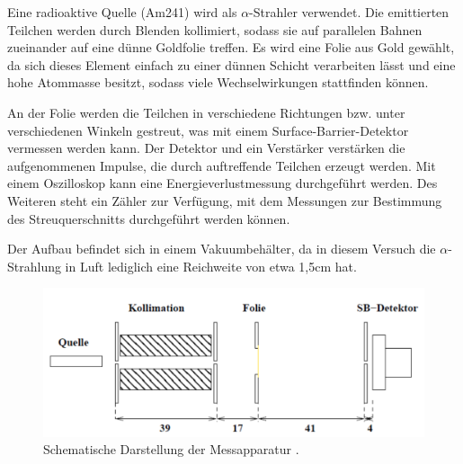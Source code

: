 Eine radioaktive Quelle (Am241) wird als $\alpha$-Strahler verwendet. Die emittierten Teilchen werden durch Blenden
kollimiert, sodass sie auf parallelen Bahnen zueinander auf eine dünne Goldfolie treffen. Es wird eine Folie aus Gold
gewählt, da sich dieses Element einfach zu einer dünnen Schicht verarbeiten lässt und eine hohe Atommasse besitzt, sodass
viele Wechselwirkungen stattfinden können.

An der Folie werden die Teilchen
in verschiedene Richtungen bzw. unter verschiedenen Winkeln gestreut, was mit einem Surface-Barrier-Detektor vermessen
werden kann. Der Detektor und ein Verstärker verstärken die aufgenommenen Impulse, die durch auftreffende Teilchen erzeugt
werden. Mit einem Oszilloskop kann eine Energieverlustmessung durchgeführt werden. Des Weiteren steht ein Zähler zur
Verfügung, mit dem Messungen zur Bestimmung des Streuquerschnitts durchgeführt werden können.

Der Aufbau befindet sich in einem Vakuumbehälter, da in diesem Versuch die $\alpha$-Strahlung in Luft lediglich eine
Reichweite von etwa 1,5cm hat.

\begin{figure}
\centering
\includegraphics[width=\textwidth]{aufbau.png}
\caption{Schematische Darstellung der Messapparatur \cite[2]{anleitung}.}
\label{fig:aufbau}
\end{figure}
